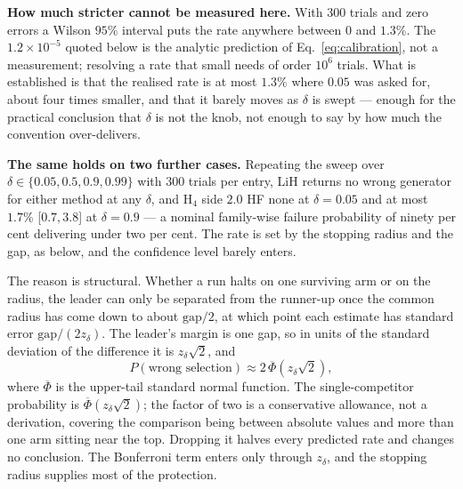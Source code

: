 \documentclass[10pt]{article}
\begin{document}
\textbf{How much stricter cannot be measured here.} With 300 trials and zero
errors a Wilson $95\%$ interval puts the rate anywhere between $0$ and $1.3\%$.
The $1.2\times10^{-5}$ quoted below is the analytic prediction of
Eq.~\eqref{eq:calibration}, not a measurement; resolving a rate that small needs
of order $10^{6}$ trials. What is established is that the realised rate is at most
$1.3\%$ where $0.05$ was asked for, about four times smaller, and that it barely
moves as $\delta$ is swept --- enough for the practical conclusion that $\delta$
is not the knob, not enough to say by how much the convention over-delivers.

\textbf{The same holds on two further cases.} Repeating the sweep over
$\delta\in\{0.05,0.5,0.9,0.99\}$ with 300 trials per entry, LiH returns no wrong
generator for either method at any $\delta$, and H$_4$ side $2.0$ HF none at
$\delta=0.05$ and at most $1.7\%$ [$0.7,3.8$] at $\delta=0.9$ --- a nominal
family-wise failure probability of ninety per cent delivering under two per cent.
The rate is set by the stopping radius and the gap, as below, and the confidence
level barely enters.

The reason is structural. Whether a run halts on one surviving arm or on the
radius, the leader can only be separated from the runner-up once the common
radius has come down to about $\mathrm{gap}/2$, at which point each estimate has
standard error $\mathrm{gap}/(2z_\delta)$. The leader's margin is one gap, so in
units of the standard deviation of the difference it is $z_\delta\sqrt2$, and
\begin{equation}
  P(\text{wrong selection})\approx 2\,\overline\Phi\!\left(z_\delta\sqrt2\right),
  \label{eq:calibration}
\end{equation}
where $\overline\Phi$ is the upper-tail standard normal function. The
single-competitor probability is $\overline\Phi(z_\delta\sqrt2)$; the factor of
two is a conservative allowance, not a derivation, covering the comparison being
between absolute values and more than one arm sitting near the top. Dropping it
halves every predicted rate and changes no conclusion. The Bonferroni term enters
only through $z_\delta$, and the stopping radius supplies most of the protection.
\end{document}
